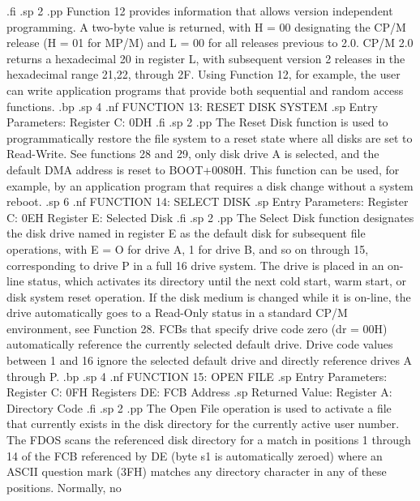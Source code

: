 .fi
.sp 2
.pp
Function 12 provides information that allows version independent 
programming.  A two-byte value is returned, with H = 00 
designating the CP/M release (H = 01 for MP/M) and L = 00 for 
all releases previous to 2.0.  CP/M 2.0 returns a hexadecimal 20 
in register L, with subsequent version 2 releases in the 
hexadecimal range 21,22, through 2F.  Using Function 12, for 
example, the user can write application programs that provide 
both sequential and random access functions.
.bp
.sp 4
.nf
                 FUNCTION 13:  RESET DISK SYSTEM
.sp
                    Entry Parameters:
                          Register C:  0DH
.fi
.sp 2
.pp
The Reset Disk function is used to programmatically restore the 
file system to a reset state where all disks are set to 
Read-Write.  See functions 28 and 29, only disk drive A is 
selected, and the default DMA address is reset to BOOT+0080H.  
This function can be used, for example, by an application program 
that requires a disk change without a system reboot.
.sp 6
.nf
                    FUNCTION 14:  SELECT DISK
.sp
                 Entry Parameters:
                       Register C:  0EH
                       Register E:  Selected Disk
.fi
.sp 2
.pp
The Select Disk function designates the disk drive named in register
E as the default disk for subsequent file operations, with E = O
for drive A, 1 for drive B, and so on through 15, corresponding to drive
P in a full 16 drive system.  The drive is placed in an on-line 
status, which activates its directory until the next cold start, 
warm start, or disk system reset operation.  If the disk medium 
is changed while it is on-line, the drive automatically goes to 
a Read-Only status in a standard CP/M environment, see Function 
28.  FCBs that specify drive code zero (dr = 00H) automatically 
reference the currently selected default drive.  Drive code 
values between 1 and 16 ignore the selected default 
drive and directly reference drives A through P.
.bp
.sp 4
.nf
                     FUNCTION 15:  OPEN FILE
.sp
                Entry Parameters:
                      Register C:  0FH
                    Registers DE:  FCB Address
.sp
                Returned Value:
                     Register  A:  Directory Code
.fi
.sp 2
.pp
The Open File operation is used to activate a file that currently 
exists in the disk directory for the currently active user 
number.  The FDOS scans the referenced disk directory for a match 
in positions 1 through 14 of the FCB referenced by DE (byte s1 is 
automatically zeroed) where an ASCII question mark (3FH) matches 
any directory character in any of these positions.  Normally, no 
